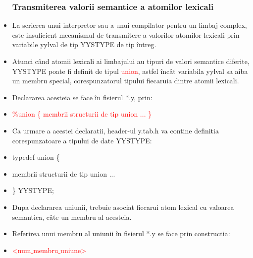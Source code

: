 \documentclass[pdf]{beamer}
\begin{document}
\begin{frame}
\begin{itemize}
\frametitle{Transmiterea valorii semantice a atomilor lexicali}
\item
La scrierea unui interpretor sau a unui compilator pentru un limbaj complex, este insuficient mecanismul de transmitere a valorilor atomilor lexicali prin variabile yylval de tip YYSTYPE de tip întreg.
\item
Atunci când atomii lexicali ai limbajului au tipuri de valori semantice diferite, YYSTYPE poate fi definit de tipul \textcolor{red}{union}, astfel încât variabila yylval sa aiba un membru special, corespunzatorul tipului fiecaruia dintre atomii lexicali.
\item
Declararea acesteia se face în fisierul *.y, prin:
\item
\quad \textcolor{red}{\%union \{ membrii structurii de tip union ... \}}

\end{itemize}
\end{frame}



\begin{frame}
\begin{itemize}
\frametitle{Transmiterea valorii semantice a atomilor lexicali}
\item
Ca urmare a acestei declaratii, header-ul y.tab.h va contine definitia corespunzatoare a tipului de date YYSTYPE:
\item \color{red}
typedef union \{
\item \qquad
membrii structurii de tip union ... 
\item \qquad
\} YYSTYPE;
\item \color{black}
Dupa declararea uniunii, trebuie asociat fiecarui atom lexical cu valoarea semantica, câte un membru al acesteia.
\item
Referirea unui membru al uniunii în fisierul *.y se face prin constructia:
\item \qquad
\textcolor{red}{<num\underline{ }membru\underline{ }uniune>}

\end{itemize}
\end{frame}
\end{document}

